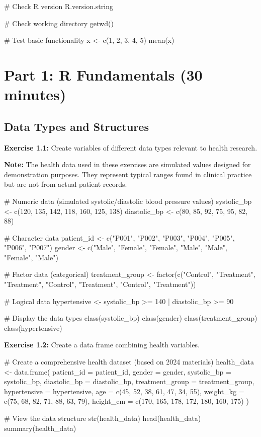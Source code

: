 \documentclass[11pt]{article}
\begin{document}
\begin{rcode}
# Check R version
R.version.string

# Check working directory
getwd()

# Test basic functionality
x <- c(1, 2, 3, 4, 5)
mean(x)
\end{rcode}

\section{Part 1: R Fundamentals (30 minutes)}

\subsection{Data Types and Structures}

\textbf{Exercise 1.1:} Create variables of different data types relevant to health research.

\textbf{Note:} The health data used in these exercises are simulated values designed for demonstration purposes. They represent typical ranges found in clinical practice but are not from actual patient records.

\begin{rcode}
# Numeric data (simulated systolic/diastolic blood pressure values)
systolic_bp <- c(120, 135, 142, 118, 160, 125, 138)
diastolic_bp <- c(80, 85, 92, 75, 95, 82, 88)

# Character data
patient_id <- c("P001", "P002", "P003", "P004", "P005", "P006", "P007")
gender <- c("Male", "Female", "Female", "Male", "Male", "Female", "Male")

# Factor data (categorical)
treatment_group <- factor(c("Control", "Treatment", "Treatment",
                           "Control", "Treatment", "Control", "Treatment"))

# Logical data
hypertensive <- systolic_bp >= 140 | diastolic_bp >= 90

# Display the data types
class(systolic_bp)
class(gender)
class(treatment_group)
class(hypertensive)
\end{rcode}

\textbf{Exercise 1.2:} Create a data frame combining health variables.

\begin{rcode}
# Create a comprehensive health dataset (based on 2024 materials)
health_data <- data.frame(
  patient_id = patient_id,
  gender = gender,
  systolic_bp = systolic_bp,
  diastolic_bp = diastolic_bp,
  treatment_group = treatment_group,
  hypertensive = hypertensive,
  age = c(45, 52, 38, 61, 47, 34, 55),
  weight_kg = c(75, 68, 82, 71, 88, 63, 79),
  height_cm = c(170, 165, 178, 172, 180, 160, 175)
)

# View the data structure
str(health_data)
head(health_data)
summary(health_data)
\end{rcode}
\end{document}
